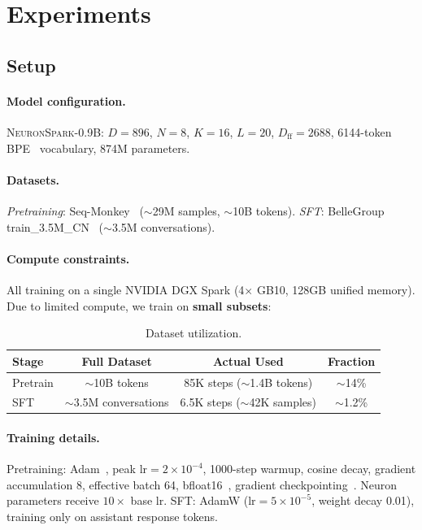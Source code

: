 \documentclass{article}
\newcommand{\model}{\textsc{NeuronSpark}}
\begin{document}
\section{Experiments}
\label{sec:experiments}

\subsection{Setup}

\paragraph{Model configuration.}
\model{}-0.9B: $D=896$, $N=8$, $K=16$, $L=20$, $D_{\text{ff}}=2688$, 6144-token BPE~\citep{sennrich2016neural} vocabulary, 874M parameters.

\paragraph{Datasets.}
\emph{Pretraining}: Seq-Monkey~\citep{seqmonkey2023} ($\sim$29M samples, $\sim$10B tokens).
\emph{SFT}: BelleGroup train\_3.5M\_CN~\citep{bellegroup2023} ($\sim$3.5M conversations).

\paragraph{Compute constraints.}
All training on a single NVIDIA DGX Spark (4$\times$ GB10, 128GB unified memory).
Due to limited compute, we train on \textbf{small subsets}:

\begin{table}[H]
\centering
\small
\caption{Dataset utilization.}
\label{tab:data}
\begin{tabular}{lccc}
\toprule
\textbf{Stage} & \textbf{Full Dataset} & \textbf{Actual Used} & \textbf{Fraction} \\
\midrule
Pretrain & $\sim$10B tokens & 85K steps ($\sim$1.4B tokens) & $\sim$14\% \\
SFT & $\sim$3.5M conversations & 6.5K steps ($\sim$42K samples) & $\sim$1.2\% \\
\bottomrule
\end{tabular}
\end{table}

\paragraph{Training details.}
Pretraining: Adam~\citep{loshchilov2019decoupled}, peak lr$=2{\times}10^{-4}$, 1000-step warmup, cosine decay, gradient accumulation 8, effective batch 64, bfloat16~\citep{micikevicius2018mixed}, gradient checkpointing~\citep{chen2016training}.
Neuron parameters receive $10\times$ base lr.
SFT: AdamW (lr$=5{\times}10^{-5}$, weight decay 0.01), training only on assistant response tokens.
\end{document}
